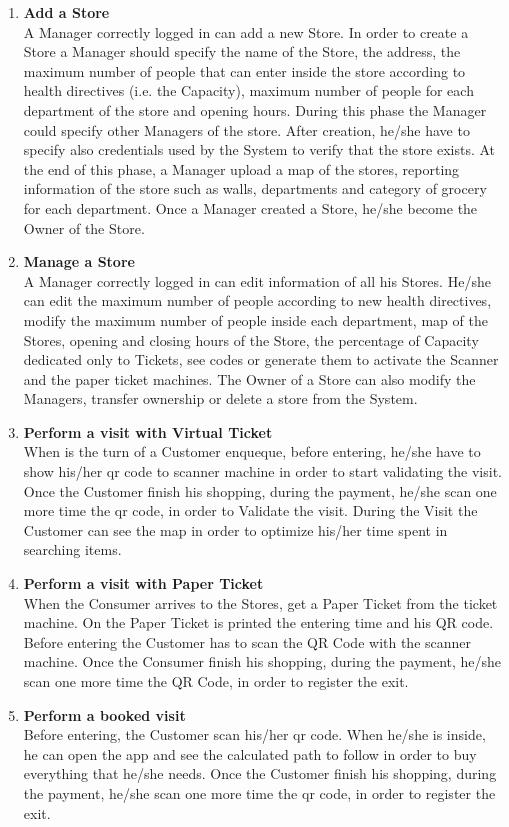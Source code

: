 \documentclass[a4paper, 12pt, oneside]{article}
\begin{document}
\begin{enumerate}
    \item \textbf{Add a Store}
    \\
        A Manager correctly logged in can add a new  Store.
        In order to create a Store a Manager should specify the name of the Store, the address, the maximum number of people that can enter inside the store according to health directives (i.e. the Capacity), maximum number of people for each department of the store and opening hours. During this phase the Manager could specify other Managers of the store. After creation, he/she have to specify also credentials used by the System to verify that the store exists. At the end of this phase, a Manager upload a map of the stores, reporting information of the store such as walls, departments and category of grocery for each department. Once a Manager created a Store, he/she become the Owner of the Store.
    \\
    \item \textbf{Manage a Store}
    \\
        A Manager correctly logged in can edit information of all his Stores. He/she can edit the maximum number of people according to new health directives, modify the maximum number of people inside each department, map of the Stores, opening and closing hours of the Store, the percentage of Capacity dedicated only to Tickets, see codes or generate them to activate the Scanner and the paper ticket machines. The Owner of a Store can also modify the Managers, transfer ownership or delete a store from the System. 
    \\
    \item \textbf{Perform a visit with Virtual Ticket}
    \\
        When is the turn of a Customer enqueque, before entering, he/she have to show his/her qr code to scanner machine in order to start validating the visit.
        Once the Customer finish his shopping, during the payment, he/she scan one more time the qr code, in order to Validate the visit.
        During the Visit the Customer can see the map in order to optimize his/her time spent in searching items.
    \\
    \item \textbf{Perform a visit with Paper Ticket}
     \\
        When the Consumer arrives to the Stores, get a Paper Ticket from the ticket machine. On the Paper Ticket is printed the entering time and his QR code. Before entering the Customer has to scan the QR Code with the scanner machine. Once the Consumer finish his shopping, during the payment, he/she scan one more time the QR Code, in order to register the exit. 
    \item \textbf{Perform a booked visit}
    \\
        Before entering, the Customer scan his/her qr code. When he/she is inside, he can open the app and see the calculated path to follow in order to buy everything that he/she needs. Once the Customer finish his shopping, during the payment, he/she scan one more time the qr code, in order to register the exit.
\end{enumerate}
\end{document}
